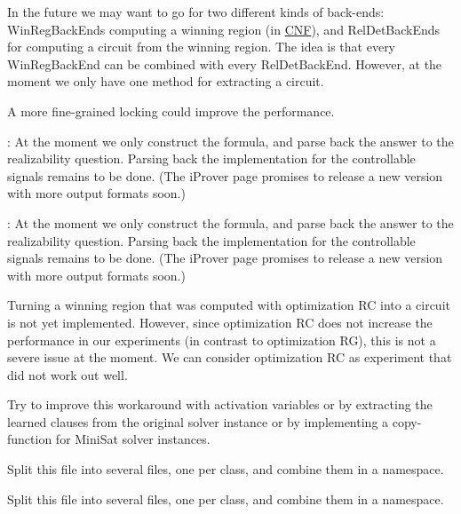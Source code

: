 
\begin{DoxyRefList}
\item[\label{todo__todo000001}%
\hypertarget{todo__todo000001}{}%
Class \hyperlink{classBackEnd}{Back\-End} ]In the future we may want to go for two different kinds of back-\/ends\-: Win\-Reg\-Back\-Ends computing a winning region (in \hyperlink{classCNF}{C\-N\-F}), and Rel\-Det\-Back\-Ends for computing a circuit from the winning region. The idea is that every Win\-Reg\-Back\-End can be combined with every Rel\-Det\-Back\-End. However, at the moment we only have one method for extracting a circuit.  
\item[\label{todo__todo000008}%
\hypertarget{todo__todo000008}{}%
Member \hyperlink{classClauseExplorerSAT_a674651f8fbf9ed93264ce3369bd5332b}{Clause\-Explorer\-S\-A\-T\-:\-:new\-\_\-info\-\_\-lock\-\_\-} ]A more fine-\/grained locking could improve the performance.  
\item[\label{todo__todo000002}%
\hypertarget{todo__todo000002}{}%
Class \hyperlink{classEPRSynthesizer}{E\-P\-R\-Synthesizer} ]\-: At the moment we only construct the formula, and parse back the answer to the realizability question. Parsing back the implementation for the controllable signals remains to be done. (The i\-Prover page promises to release a new version with more output formats soon.)  
\item[\label{todo__todo000003}%
\hypertarget{todo__todo000003}{}%
Member \hyperlink{classEPRSynthesizer_ab5eb613a7e5e4f8d408938531f745e4e}{E\-P\-R\-Synthesizer\-:\-:run} ()]\-: At the moment we only construct the formula, and parse back the answer to the realizability question. Parsing back the implementation for the controllable signals remains to be done. (The i\-Prover page promises to release a new version with more output formats soon.)  
\item[\label{todo__todo000004}%
\hypertarget{todo__todo000004}{}%
Class \hyperlink{classLearnSynthQBFInd}{Learn\-Synth\-Q\-B\-F\-Ind} ]Turning a winning region that was computed with optimization R\-C into a circuit is not yet implemented. However, since optimization R\-C does not increase the performance in our experiments (in contrast to optimization R\-G), this is not a severe issue at the moment. We can consider optimization R\-C as experiment that did not work out well.  
\item[\label{todo__todo000005}%
\hypertarget{todo__todo000005}{}%
Member \hyperlink{classMiniSatApi_a27013ace25320f68252bef5ba9f2e9ad}{Mini\-Sat\-Api\-:\-:inc\-Push} ()]Try to improve this workaround with activation variables or by extracting the learned clauses from the original solver instance or by implementing a copy-\/function for Mini\-Sat solver instances.  
\item[\label{todo__todo000006}%
\hypertarget{todo__todo000006}{}%
File \hyperlink{ParallelLearner_8cpp}{Parallel\-Learner.cpp} ]Split this file into several files, one per class, and combine them in a namespace.  
\item[\label{todo__todo000007}%
\hypertarget{todo__todo000007}{}%
File \hyperlink{ParallelLearner_8h}{Parallel\-Learner.h} ]Split this file into several files, one per class, and combine them in a namespace. 
\end{DoxyRefList}